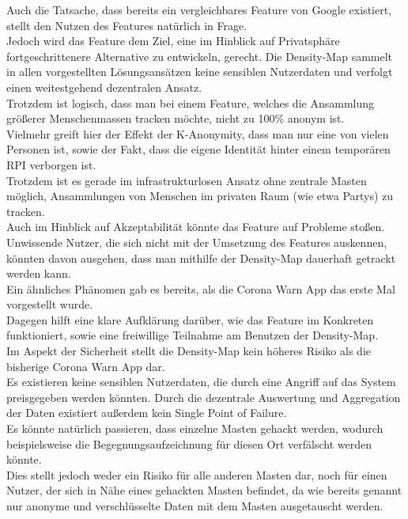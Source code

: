 \documentclass[conference]{IEEEtran}
\begin{document}
Auch die Tatsache, dass bereits ein vergleichbares Feature von Google existiert, stellt den Nutzen des Features natürlich in Frage.\\
Jedoch wird das Feature dem Ziel, eine im Hinblick auf Privatsphäre fortgeschrittenere Alternative zu entwickeln, gerecht. 
Die Density-Map sammelt in allen vorgestellten Lösungsansätzen keine sensiblen Nutzerdaten und verfolgt einen weitestgehend dezentralen Ansatz.\\
Trotzdem ist logisch, dass man bei einem Feature, welches die Ansammlung größerer Menschenmassen tracken möchte, nicht zu 100\% anonym ist.\\
Vielmehr greift hier der Effekt der K-Anonymity, dass man nur eine von vielen Personen ist, sowie der Fakt, dass die eigene Identität hinter einem temporären RPI verborgen ist.\\
Trotzdem ist es gerade im infrastrukturlosen Ansatz ohne zentrale Masten möglich, Ansammlungen von Menschen im privaten Raum (wie etwa Partys) zu tracken.\\

Auch im Hinblick auf Akzeptabilität könnte das Feature auf Probleme stoßen.\\
Unwissende Nutzer, die sich nicht mit der Umsetzung des Features auskennen, könnten davon ausgehen, dass man mithilfe der Density-Map dauerhaft getrackt werden kann.\\
Ein ähnliches Phänomen gab es bereits, als die Corona Warn App das erste Mal vorgestellt wurde.\\
Dagegen hilft eine klare Aufklärung darüber, wie das Feature im Konkreten funktioniert, sowie eine freiwillige Teilnahme am Benutzen der Density-Map.\\

Im Aspekt der Sicherheit stellt die Density-Map kein höheres Risiko als die bisherige Corona Warn App dar.\\ 
Es existieren keine sensiblen Nutzerdaten, die durch eine Angriff auf das System preisgegeben werden könnten. Durch die dezentrale Auswertung und Aggregation der Daten existiert außerdem kein Single Point of Failure.\\
Es könnte natürlich passieren, dass einzelne Masten gehackt werden, wodurch beispielsweise die Begegnungsaufzeichnung für diesen Ort verfälscht werden könnte.\\
Dies stellt jedoch weder ein Risiko für alle anderen Masten dar, noch für einen Nutzer, der sich in Nähe eines gehackten Masten befindet, da wie bereits genannt nur anonyme und verschlüsselte Daten mit dem Masten ausgetauscht werden.
\end{document}
